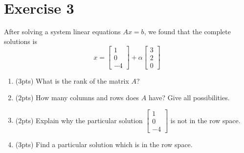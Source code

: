 \section{Exercise 3}
After solving a system linear equations $Ax=b$, we found that the complete
solutions is
\begin{equation}
    x   =
        \begin{bmatrix}
            1       \\
            0       \\
            -4
        \end{bmatrix}
        +
        \alpha
        \begin{bmatrix}
            3       \\
            2       \\
            0
        \end{bmatrix}
\end{equation}
\begin{enumerate}[label=(\alph*)]
    \item (3pts) What is the rank of the matrix $A$?
    \item (2pts) How many columns and rows does $A$ have? Give all
        possibilities.
    \item (2pts) Explain why the particular solution
        $\begin{bmatrix} 1  \\  0   \\  -4 \end{bmatrix}$ is not in the row
            space.
    \item (3pts) Find a particular solution which is in the row space.
\end{enumerate}

